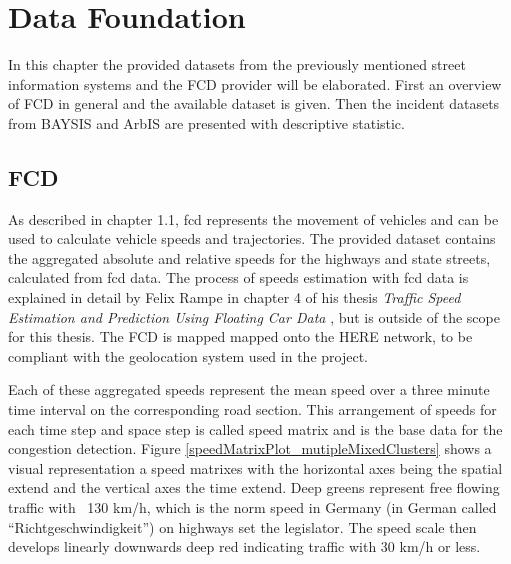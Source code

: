 \documentclass[a4paper,12pt]{report}
\begin{document}
\chapter{Data Foundation}
\label{data}
In this chapter the provided datasets from the previously mentioned street information systems and the FCD provider will be elaborated. First an overview of FCD in general and the available dataset is given. Then the incident datasets from BAYSIS and ArbIS are presented with descriptive statistic.

\section{FCD}
\label{dataset_fcd}
 
As described in chapter 1.1, \acrshort{fcd} represents the movement of vehicles and can be used to calculate vehicle speeds and trajectories. The provided dataset contains the aggregated absolute and relative speeds for the highways and state streets, calculated from \acrshort{fcd} data. The process of speeds estimation with \acrshort{fcd} data is explained in detail by Felix Rampe in chapter 4 of his thesis \textit{Traffic Speed Estimation and Prediction Using Floating Car Data} \cite{Rempe2018}, but is outside of the scope for this thesis. The FCD is mapped mapped onto the HERE \cite{HERE2020} network, to be compliant with the geolocation system used in the project.


Each of these aggregated speeds represent the mean speed over a three minute time interval on the corresponding road section. This arrangement of speeds for each time step and space step is called speed matrix and is the base data for the congestion detection. Figure \ref{speedMatrixPlot_mutipleMixedClusters} shows a visual representation a speed matrixes with the horizontal axes being the spatial extend and the vertical axes the time extend. Deep greens represent free flowing traffic with ~130 km/h, which is the norm speed in Germany (in German called “Richtgeschwindigkeit”) on highways set the legislator. The speed scale then develops linearly downwards deep red indicating traffic with 30 km/h or less. 
\end{document}
